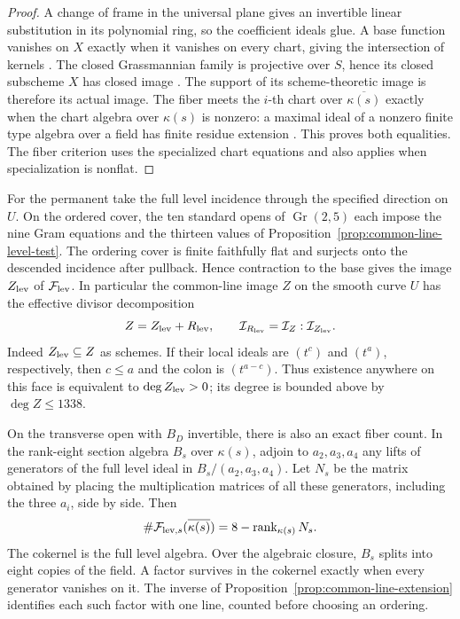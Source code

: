 \begin{proof}
A change of frame in the universal plane gives an invertible linear
substitution in its polynomial ring, so the coefficient ideals glue.
A base function vanishes on \(X\) exactly when it vanishes on every
chart, giving the intersection of kernels \cite{stacksSchemeImage}.
The closed Grassmannian family is projective over \(S\), hence its
closed subscheme \(X\) has closed image \cite{stacksprojectiveproper}.
The support of its scheme-theoretic image is therefore its actual
image. The fiber meets the \(i\)-th chart over \(\overline{\kappa(s)}\)
exactly when the chart algebra over \(\kappa(s)\) is nonzero:
a maximal ideal of a nonzero finite type algebra over a field has
finite residue extension \cite{stacksNullstellensatz}. This proves
both equalities. The fiber criterion uses the specialized chart
equations and also applies when specialization is nonflat.
\end{proof}

For the permanent take the full level incidence through the specified
direction on \(U\). On the ordered cover, the ten standard opens of
\(\operatorname{Gr}(2,5)\) each impose the nine Gram equations and
the thirteen values of Proposition~\ref{prop:common-line-level-test}.
The ordering cover is finite faithfully flat and surjects onto the
descended incidence after pullback. Hence contraction to the base gives
the image \(Z_{\rm lev}\) of \(\mathcal F_{\rm lev}\).
In particular the common-line image \(Z\) on the smooth curve \(U\)
has the effective divisor decomposition
\[
 Z=Z_{\rm lev}+R_{\rm lev},\qquad
 \mathcal I_{R_{\rm lev}}=\mathcal I_Z:\mathcal I_{Z_{\rm lev}}.
\]
Indeed \(Z_{\rm lev}\subseteq Z\) as schemes. If their local ideals
are \((t^c)\) and \((t^a)\), respectively, then \(c\le a\) and the
colon is \((t^{a-c})\). Thus existence anywhere on this face is
equivalent to \(\deg Z_{\rm lev}>0\); its degree is bounded above by
\(\deg Z\le 1338\).

On the transverse open with \(B_D\) invertible, there is also an exact
fiber count. In the rank-eight section algebra \(B_s\) over \(\kappa(s)\),
adjoin to \(a_2,a_3,a_4\) any lifts of generators of the full level ideal
in \(B_s/(a_2,a_3,a_4)\). Let \(N_s\) be the matrix obtained by placing
the multiplication matrices of all these generators, including the three
\(a_i\), side by side. Then
\[
 \#\mathcal F_{{\rm lev},s}(\overline{\kappa(s)})
       = 8-\operatorname{rank}_{\kappa(s)}N_s.
\]
The cokernel is the full level algebra. Over the algebraic closure,
\(B_s\) splits into eight copies of the field. A factor survives in
the cokernel exactly when every generator vanishes on it. The inverse
of Proposition~\ref{prop:common-line-extension} identifies each such
factor with one line, counted before choosing an ordering.

